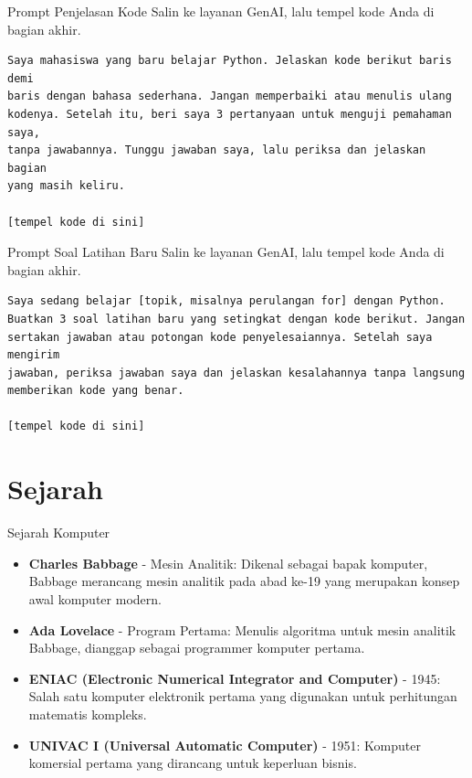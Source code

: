 \documentclass[aspectratio=169, table]{beamer}
\begin{document}
\begin{frame}[fragile]{Prompt Penjelasan Kode}
Salin ke layanan GenAI, lalu tempel kode Anda di bagian akhir.
\begin{lstlisting}[breaklines=true, basicstyle=\ttfamily\small, columns=fullflexible, frame=single]
Saya mahasiswa yang baru belajar Python. Jelaskan kode berikut baris demi
baris dengan bahasa sederhana. Jangan memperbaiki atau menulis ulang
kodenya. Setelah itu, beri saya 3 pertanyaan untuk menguji pemahaman saya,
tanpa jawabannya. Tunggu jawaban saya, lalu periksa dan jelaskan bagian
yang masih keliru.

[tempel kode di sini]
\end{lstlisting}
\end{frame}

\begin{frame}[fragile]{Prompt Soal Latihan Baru}
Salin ke layanan GenAI, lalu tempel kode Anda di bagian akhir.
\begin{lstlisting}[breaklines=true, basicstyle=\ttfamily\small, columns=fullflexible, frame=single]
Saya sedang belajar [topik, misalnya perulangan for] dengan Python.
Buatkan 3 soal latihan baru yang setingkat dengan kode berikut. Jangan
sertakan jawaban atau potongan kode penyelesaiannya. Setelah saya mengirim
jawaban, periksa jawaban saya dan jelaskan kesalahannya tanpa langsung
memberikan kode yang benar.

[tempel kode di sini]
\end{lstlisting}
\end{frame}

\section{Sejarah}
\begin{frame}{Sejarah Komputer}
	\begin{itemize}
		\item \textbf{Charles Babbage} - Mesin Analitik: Dikenal sebagai bapak komputer, Babbage merancang mesin analitik pada abad ke-19 yang merupakan konsep awal komputer modern.
		\item \textbf{Ada Lovelace} - Program Pertama: Menulis algoritma untuk mesin analitik Babbage, dianggap sebagai programmer komputer pertama.
		\item \textbf{ENIAC (Electronic Numerical Integrator and Computer)} - 1945: Salah satu komputer elektronik pertama yang digunakan untuk perhitungan matematis kompleks.
		\item \textbf{UNIVAC I (Universal Automatic Computer)} - 1951: Komputer komersial pertama yang dirancang untuk keperluan bisnis.
	\end{itemize}
\end{frame}
\end{document}
